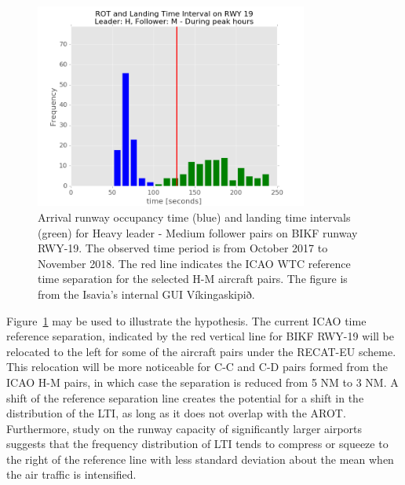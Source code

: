 \begin{figure}[h]
    \centering
    \includegraphics[width=0.8\textwidth]{graphics/fig_rot_landig_time_interval_RWY19_leader_H_follower_M_peak-hour_BAR_20171004_20181130.png}
    \caption[AROT and LTI of H-M pairs on RWY~19]{Arrival runway occupancy time (blue) and landing time intervals (green) for Heavy leader - Medium follower pairs on BIKF runway RWY-19. The observed time period is from October 2017 to November 2018. The red line indicates the ICAO WTC reference time separation for the selected H-M aircraft pairs. The figure is from the Isavia's internal GUI Víkingaskipið.}\label{fig:AROT_LTI_rwy19_H_M}
\end{figure}

Figure~\ref{fig:AROT_LTI_rwy19_H_M} may be used to illustrate the hypothesis. The current ICAO time reference separation, indicated by the red vertical line for BIKF RWY-19 will be relocated to the left for some of the aircraft pairs under the RECAT-EU scheme. This relocation will be more noticeable for C-C and C-D pairs formed from the ICAO H-M pairs, in which case the separation is reduced from 5 NM to 3 NM. A shift of the reference separation line creates the potential for a shift in the distribution of the LTI, as long as it does not overlap with the AROT. Furthermore, study on the runway capacity of significantly larger airports~\cite{kolos2013influence} suggests that the frequency distribution of LTI tends to compress or squeeze to the right of the reference line with less standard deviation about the mean when the air traffic is intensified.






